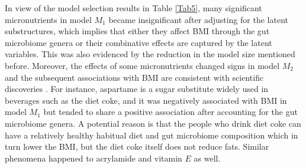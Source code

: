 \documentclass{statsoc}
\begin{document}


In view of the model selection results in Table \ref{Tab5}, many significant micronutrients in model $M_1$ became insignificant after adjusting for the latent substructures, which implies that either they affect BMI through the gut microbiome genera or their combinative effects are captured by the latent variables. This was also evidenced by the reduction in the model size mentioned before. Moreover, the effects of some micronutrients changed signs in model $M_2$ and the subsequent associations with BMI are consistent with scientific discoveries \citep{Gul17}. For instance, aspartame is a sugar substitute widely used in beverages such as the diet coke, and it was negatively associated with BMI in model $M_1$ but tended to share a positive association after accounting for the gut microbiome genera. A potential reason is that the people who drink diet coke can have a relatively healthy habitual diet and gut microbiome composition which in turn lower the BMI, but the diet coke itself does not reduce fats. Similar phenomena happened to acrylamide and vitamin $E$ as well.
\end{document}

